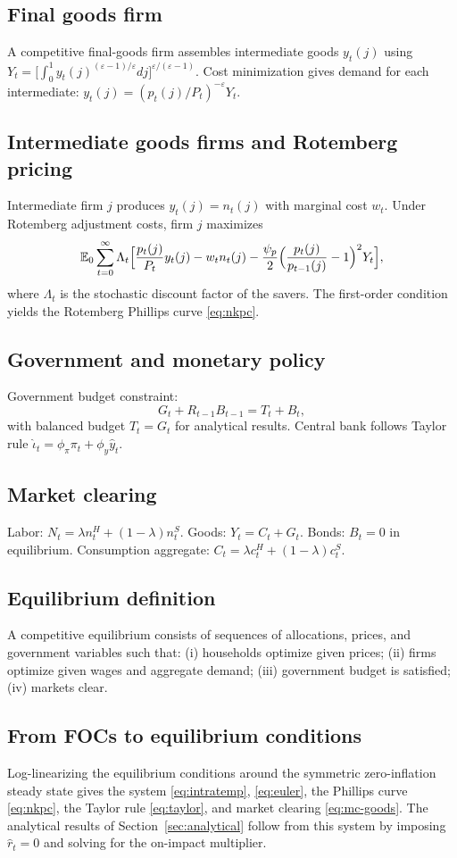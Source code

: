 \subsection{Final goods firm}\label{app:final-firm}
A competitive final-goods firm assembles intermediate goods $y_{t}(j)$ using
$Y_{t}=\bigl[\int_{0}^{1}y_{t}(j)^{(\varepsilon-1)/\varepsilon}dj\bigr]^{\varepsilon/(\varepsilon-1)}$.
Cost minimization gives demand for each intermediate:
$y_{t}(j)=(p_{t}(j)/P_{t})^{-\varepsilon}Y_{t}$.

\subsection{Intermediate goods firms and Rotemberg pricing}\label{app:intermediate-firms}
Intermediate firm $j$ produces $y_{t}(j)=n_{t}(j)$ with marginal cost $w_{t}$.
Under Rotemberg adjustment costs, firm $j$ maximizes
\[
  \mathbb{E}_{0}\sum_{t=0}^{\infty}\Lambda_{t}\Bigl[\frac{p_{t}(j)}{P_{t}}y_{t}(j)-w_{t}n_{t}(j)-\frac{\psi_{p}}{2}\Bigl(\frac{p_{t}(j)}{p_{t-1}(j)}-1\Bigr)^{2}Y_{t}\Bigr],
\]
where $\Lambda_{t}$ is the stochastic discount factor of the savers. The
first-order condition yields the Rotemberg Phillips curve
\eqref{eq:nkpc}.

\subsection{Government and monetary policy}\label{app:government}
Government budget constraint:
\[
  G_{t}+R_{t-1}B_{t-1}=T_{t}+B_{t},
\]
with balanced budget $T_{t}=G_{t}$ for analytical results. Central bank follows
Taylor rule $\hat\iota_{t}=\phi_{\pi}\pi_{t}+\phi_{y}\hat y_{t}$.

\subsection{Market clearing}\label{app:market-clearing}
Labor: $N_{t}=\lambda n^{H}_{t}+(1-\lambda)n^{S}_{t}$. Goods:
$Y_{t}=C_{t}+G_{t}$. Bonds: $B_{t}=0$ in equilibrium. Consumption aggregate:
$C_{t}=\lambda c^{H}_{t}+(1-\lambda)c^{S}_{t}$.

\subsection{Equilibrium definition}\label{app:equilibrium}
A competitive equilibrium consists of sequences of allocations, prices, and
government variables such that: (i) households optimize given prices; (ii)
firms optimize given wages and aggregate demand; (iii) government budget is
satisfied; (iv) markets clear.

\subsection{From FOCs to equilibrium conditions}\label{app:foc-to-eq}
Log-linearizing the equilibrium conditions around the symmetric zero-inflation
steady state gives the system \eqref{eq:intratemp}, \eqref{eq:euler}, the
Phillips curve \eqref{eq:nkpc}, the Taylor rule \eqref{eq:taylor}, and market
clearing \eqref{eq:mc-goods}. The analytical results of
Section~\ref{sec:analytical} follow from this system by imposing $\hat r_{t}=0$
and solving for the on-impact multiplier.
